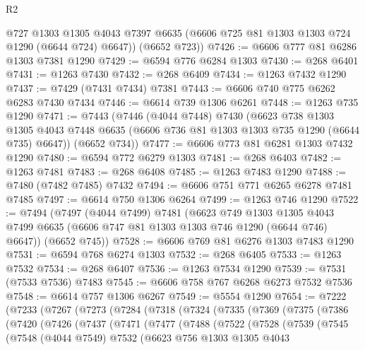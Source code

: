 \begin{lexlean}{R2}
\begin{coremodule}
        @727
        @1303
        @1305
        @4043
        @7397
        @6635
        (@6606 @725 @81 @1303 @1303 @724 @1290 (@6644 @724) @6647))
      (@6652 @723))
@7426 := @6606 @777 @81 @6286 @1303 @7381 @1290
@7429 := @6594 @776 @6284 @1303
@7430 := @268 @6401
@7431 := @1263 @7430
@7432 := @268 @6409
@7434 := @1263 @7432 @1290
@7437 := @7429 (@7431 @7434) @7381
@7443 := @6606 @740 @775 @6262 @6283 @7430 @7434
@7446 := @6614 @739 @1306 @6261
@7448 := @1263 @735 @1290
@7471 := @7443
    (@7446
      (@4044 @7448)
      @7430
      (@6623
        @738
        @1303
        @1305
        @4043
        @7448
        @6635
        (@6606 @736 @81 @1303 @1303 @735 @1290 (@6644 @735) @6647))
      (@6652 @734))
@7477 := @6606 @773 @81 @6281 @1303 @7432 @1290
@7480 := @6594 @772 @6279 @1303
@7481 := @268 @6403
@7482 := @1263 @7481
@7483 := @268 @6408
@7485 := @1263 @7483 @1290
@7488 := @7480 (@7482 @7485) @7432
@7494 := @6606 @751 @771 @6265 @6278 @7481 @7485
@7497 := @6614 @750 @1306 @6264
@7499 := @1263 @746 @1290
@7522 := @7494
    (@7497
      (@4044 @7499)
      @7481
      (@6623
        @749
        @1303
        @1305
        @4043
        @7499
        @6635
        (@6606 @747 @81 @1303 @1303 @746 @1290 (@6644 @746) @6647))
      (@6652 @745))
@7528 := @6606 @769 @81 @6276 @1303 @7483 @1290
@7531 := @6594 @768 @6274 @1303
@7532 := @268 @6405
@7533 := @1263 @7532
@7534 := @268 @6407
@7536 := @1263 @7534 @1290
@7539 := @7531 (@7533 @7536) @7483
@7545 := @6606 @758 @767 @6268 @6273 @7532 @7536
@7548 := @6614 @757 @1306 @6267
@7549 := @5554 @1290
@7654 := @7222
    (@7233
      (@7267
        (@7273
          (@7284
            (@7318
              (@7324
                (@7335
                  (@7369
                    (@7375
                      (@7386
                        (@7420
                          (@7426
                            (@7437
                              (@7471
                                (@7477
                                  (@7488
                                    (@7522
                                      (@7528
                                        (@7539
                                          (@7545
                                            (@7548
                                              (@4044 @7549)
                                              @7532
                                              (@6623
                                                @756
                                                @1303
                                                @1305
                                                @4043

\end{coremodule}
\end{lexlean}
